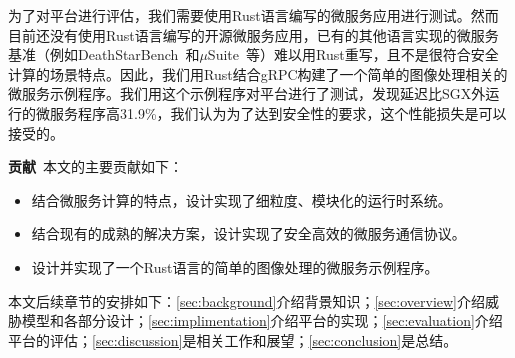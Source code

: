 为了对平台进行评估，我们需要使用Rust语言编写的微服务应用进行测试。然而目前还没有使用Rust语言编写的开源微服务应用，已有的其他语言实现的微服务基准（例如DeathStarBench~\cite{gan2019open}和$\mu$Suite~\cite{sriraman2018mu}等）难以用Rust重写，且不是很符合安全计算的场景特点。因此，我们用Rust结合gRPC构建了一个简单的图像处理相关的微服务示例程序。我们用这个示例程序对平台进行了测试，发现延迟比SGX外运行的微服务程序高31.9\%，我们认为为了达到安全性的要求，这个性能损失是可以接受的。

\textbf{贡献}\ 本文的主要贡献如下：
\begin{itemize}
    \item 结合微服务计算的特点，设计实现了细粒度、模块化的运行时系统。
    \item 结合现有的成熟的解决方案，设计实现了安全高效的微服务通信协议。
    \item 设计并实现了一个Rust语言的简单的图像处理的微服务示例程序。
\end{itemize}

本文后续章节的安排如下：\cref{sec:background}介绍背景知识；\cref{sec:overview}介绍威胁模型和各部分设计；\cref{sec:implimentation}介绍平台的实现；\cref{sec:evaluation}介绍平台的评估；\cref{sec:discussion}是相关工作和展望；\cref{sec:conclusion}是总结。



